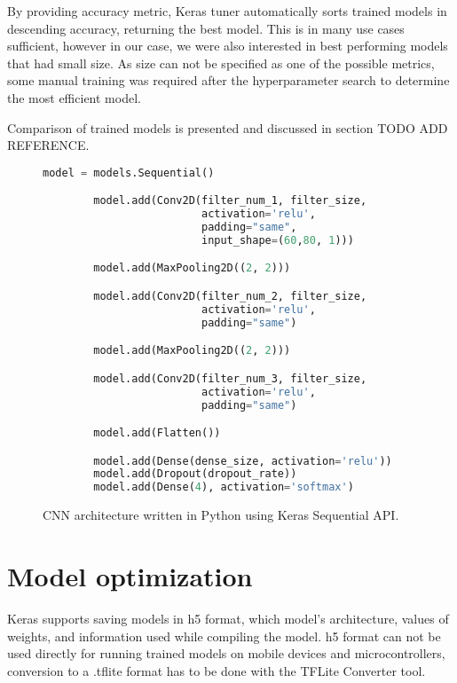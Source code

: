 By providing accuracy metric, Keras tuner automatically sorts trained models in descending accuracy, returning the best model.
This is in many use cases sufficient, however in our case, we were also interested in best performing models that had small size. 
As size can not be specified as one of the possible metrics, some manual training was required after the hyperparameter search to determine the most efficient model.

Comparison of trained models is presented and discussed in section TODO ADD REFERENCE.

\lstset{style=mystyle}

\begin{figure}[ht] 
    \begin{lstlisting}[language=Python]
        model = models.Sequential()

        model.add(Conv2D(filter_num_1, filter_size, 
                         activation='relu', 
                         padding="same", 
                         input_shape=(60,80, 1)))

        model.add(MaxPooling2D((2, 2)))

        model.add(Conv2D(filter_num_2, filter_size, 
                         activation='relu', 
                         padding="same")

        model.add(MaxPooling2D((2, 2)))

        model.add(Conv2D(filter_num_3, filter_size, 
                         activation='relu', 
                         padding="same")

        model.add(Flatten())

        model.add(Dense(dense_size, activation='relu'))
        model.add(Dropout(dropout_rate))
        model.add(Dense(4), activation='softmax')
    \end{lstlisting}
    \caption{ CNN architecture written in Python using Keras Sequential API.}
    \label{model_code}
\end{figure}


\section{ Model optimization}

Keras supports saving models in h5 format, which model's architecture, values of weights, and information used while compiling the model.
h5 format can not be used directly for running trained models on mobile devices and microcontrollers, conversion to a .tflite format has to be done with the TFLite Converter tool.

